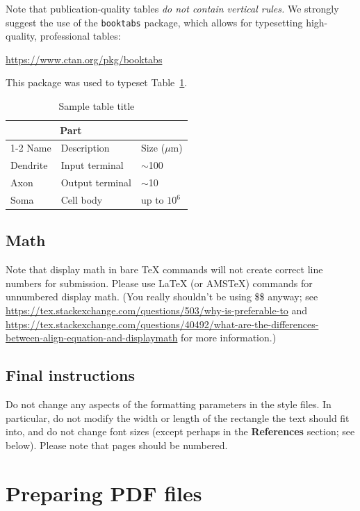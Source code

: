 \documentclass{article}
\begin{document}
Note that publication-quality tables \emph{do not contain vertical rules.} We
strongly suggest the use of the \verb+booktabs+ package, which allows for
typesetting high-quality, professional tables:
\begin{center}
  \url{https://www.ctan.org/pkg/booktabs}
\end{center}
This package was used to typeset Table~\ref{sample-table}.


\begin{table}
  \caption{Sample table title}
  \label{sample-table}
  \centering
  \begin{tabular}{lll}
    \toprule
    \multicolumn{2}{c}{Part}                   \\
    \cmidrule(r){1-2}
    Name     & Description     & Size ($\mu$m) \\
    \midrule
    Dendrite & Input terminal  & $\sim$100     \\
    Axon     & Output terminal & $\sim$10      \\
    Soma     & Cell body       & up to $10^6$  \\
    \bottomrule
  \end{tabular}
\end{table}

\subsection{Math}
Note that display math in bare TeX commands will not create correct line numbers for submission. Please use LaTeX (or AMSTeX) commands for unnumbered display math. (You really shouldn't be using \$\$ anyway; see \url{https://tex.stackexchange.com/questions/503/why-is-preferable-to} and \url{https://tex.stackexchange.com/questions/40492/what-are-the-differences-between-align-equation-and-displaymath} for more information.)

\subsection{Final instructions}

Do not change any aspects of the formatting parameters in the style files.  In
particular, do not modify the width or length of the rectangle the text should
fit into, and do not change font sizes (except perhaps in the
\textbf{References} section; see below). Please note that pages should be
numbered.


\section{Preparing PDF files}
\end{document}
